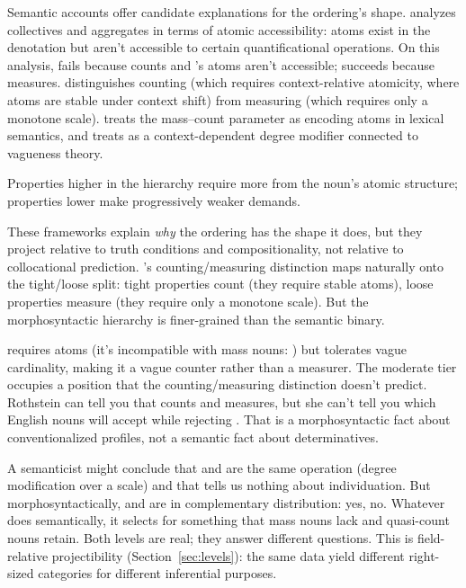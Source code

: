 \documentclass[12pt,a4paper]{article}
\begin{document}
Semantic accounts offer candidate explanations for the ordering's shape. \textcite{grimm2018} analyzes collectives and aggregates in terms of atomic accessibility: atoms exist in the denotation but aren't accessible to certain quantificational operations. On this analysis,  fails because  counts and 's atoms aren't accessible;  succeeds because  measures. \textcite{rothstein2010} distinguishes counting (which requires context-relative atomicity, where atoms are stable under context shift) from measuring (which requires only a monotone scale). \textcite{chierchia1998} treats the mass--count parameter as encoding atoms in lexical semantics, and \textcite{hackl2000} treats  as a context-dependent degree modifier connected to vagueness theory.

Properties higher in the hierarchy require more from the noun's atomic structure; properties lower make progressively weaker demands.

These frameworks explain \textit{why} the ordering has the shape it does, but they project relative to truth conditions and compositionality, not relative to collocational prediction. \textcite{rothstein2010}'s counting/measuring distinction maps naturally onto the tight/loose split: tight properties count (they require stable atoms), loose properties measure (they require only a monotone scale). But the morphosyntactic hierarchy is finer-grained than the semantic binary.

 requires atoms (it's incompatible with mass nouns: ) but tolerates vague cardinality, making it a vague counter rather than a measurer. The moderate tier occupies a position that the counting/measuring distinction doesn't predict. Rothstein can tell you that  counts and  measures, but she can't tell you which English nouns will accept  while rejecting . That is a morphosyntactic fact about conventionalized profiles, not a semantic fact about determinatives.

A semanticist might conclude that  and  are the same operation (degree modification over a scale) and that  tells us nothing about individuation. But morphosyntactically,  and  are in complementary distribution:  yes,  no. Whatever  does semantically, it selects for something that mass nouns lack and quasi-count nouns retain. Both levels are real; they answer different questions. This is field-relative projectibility (Section~\ref{sec:levels}): the same data yield different right-sized categories for different inferential purposes.
\end{document}
